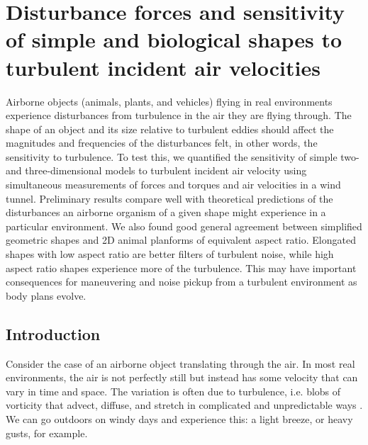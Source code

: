 
\chapter{Disturbance forces and sensitivity of simple and biological shapes to turbulent incident air velocities }
\label{ch:4}

Airborne objects (animals, plants, and vehicles) flying in real environments experience disturbances from turbulence in the air they are flying through.  The shape of an object and its size relative to turbulent eddies should affect the magnitudes and frequencies of the disturbances felt, in other words, the sensitivity to turbulence.  To test this, we quantified the sensitivity of simple two- and three-dimensional models to turbulent incident air velocity using simultaneous measurements of forces and torques and air velocities in a wind tunnel. Preliminary results compare well with theoretical predictions of the disturbances an airborne organism of a given shape might experience in a particular environment.  We also found good general agreement between simplified geometric shapes and 2D animal planforms of equivalent aspect ratio.  Elongated shapes with low aspect ratio are better filters of turbulent noise, while high aspect ratio shapes experience more of the turbulence.  This may have important consequences for maneuvering and noise pickup from a turbulent environment as body plans evolve.

\section{Introduction}
Consider the case of an airborne object translating through the air.  In most real environments, the air is not perfectly still but instead has some velocity that can vary in time and space.  The variation is often due to turbulence, i.e. blobs of vorticity that advect, diffuse, and stretch in complicated and unpredictable ways \cite{Tennekes:1972,Davidson:2004}.  We can go outdoors on windy days and experience this: a light breeze, or heavy gusts, for example. 


